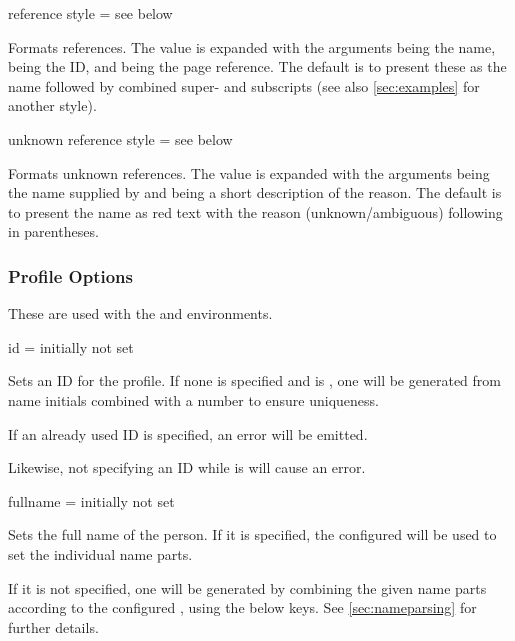 \documentclass[
	a4paper,
]{article}
\begin{document}
\begin{docKey}
	{reference style}
	{=}
	{see below}

	Formats references. The value is expanded with the arguments  being the name,  being the ID, and  being the page reference. The default is to present these as the name followed by combined super- and subscripts (see also \cref{sec:examples} for another style).
\end{docKey}

\begin{docKey}
	{unknown reference style}
	{=}
	{see below}

	Formats unknown references. The value is expanded with the arguments  being the name supplied by  and  being a short description of the reason. The default is to present the name as red text with the reason (unknown/ambiguous) following in parentheses.
\end{docKey}


\subsubsection{Profile Options} %

\label{sec:profopts}
These are used with the  and  environments.

\begin{docKey}
	{id}
	{=}
	{initially not set}

	Sets an ID for the profile. If none is specified and  is , one will be generated from name initials combined with a number to ensure uniqueness.

	If an already used ID is specified, an error will be emitted.

	Likewise, not specifying an ID while  is  will cause an error.
\end{docKey}

\begin{docKey}
	{fullname}
	{=}
	{initially not set}

	Sets the full name of the person. If it is specified, the configured  will be used to set the individual name parts.

	If it is not specified, one will be generated by combining the given name parts according to the configured , using the below keys. See \cref{sec:nameparsing} for further details.
\end{docKey}
\end{document}
